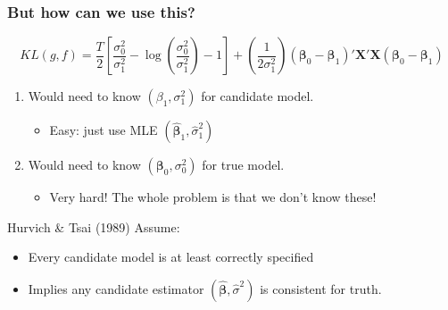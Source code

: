 \begin{frame}
  \frametitle{But how can we use this?}
  \vspace{-1em}
  \small
      \[
        KL(g,f) = \frac{T}{2}\left[ \frac{\sigma_0^2}{\sigma_1^2} - \log \left( \frac{\sigma_0^2}{\sigma_1^2} \right) - 1\right] + \left(\frac{1}{2\sigma_1^2}\right)(\boldsymbol{\beta}_0 - \boldsymbol{\beta}_1)' \mathbf{X}'\mathbf{X} (\boldsymbol{\beta}_0 - \boldsymbol{\beta}_1)
      \]
      \normalsize

      \vspace{-1em}
      \begin{enumerate}
        \item Would need to know $(\beta_1, \sigma_1^2)$ for \alert{candidate model}.
          \begin{itemize}
            \item Easy: just use MLE $(\widehat{\boldsymbol{\beta}}_1, \widehat{\sigma}_1^2)$
          \end{itemize}
        \item Would need to know $(\boldsymbol{\beta}_0, \sigma_0^2)$ for \alert{true model}.
          \begin{itemize}
            \item Very hard! The whole problem is that we don't know these!
          \end{itemize}
      \end{enumerate}

      \pause

      \begin{block}{Hurvich \& Tsai (1989) Assume:}
        \vspace{-0.5em}
        \begin{itemize}
          \item Every candidate model is \alert{at least correctly specified}
          \item Implies any candidate estimator $(\widehat{\boldsymbol{\beta}}, \widehat{\sigma}^2)$ is consistent for truth.
        \end{itemize}

      \end{block}
\end{frame}
